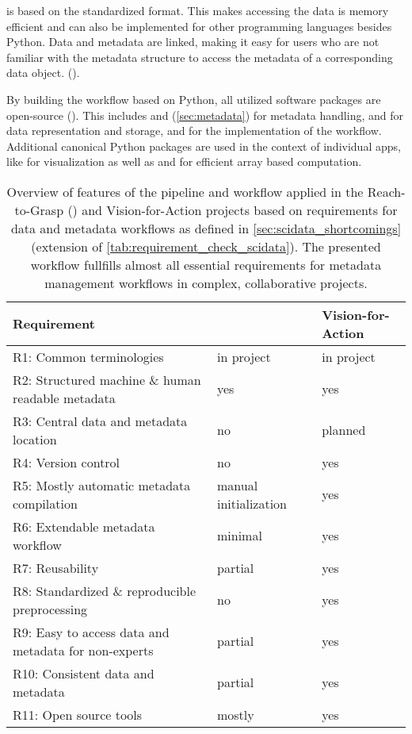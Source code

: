  is based on the standardized  format. This makes accessing the data is memory efficient and can also be implemented for other programming languages besides Python. Data and metadata are linked, making it easy for users who are not familiar with the metadata structure to access the metadata of a corresponding data object. ().

By building the workflow based on Python, all utilized software packages are open-source (). This includes  and  (\cref{sec:metadata}) for metadata handling,  and  for data representation and storage, and  for the implementation of the workflow. Additional  canonical Python packages are used in the context of individual apps, like  for visualization as well as  and  for efficient array based computation.

\begin{table}[]
\footnotesize
\begin{tabular}{|l|l|l|}
\hline
Requirement                                          &  \cite{Brochier_2018} & Vision-for-Action \\  \hline
R1: Common terminologies                             &  in project & in project \\ \hline
R2: Structured machine \& human readable metadata    &  yes & yes \\ \hline
R3: Central data and metadata location               &  no & planned \\ \hline
R4: Version control                                  &  no & yes \\ \hline
R5: Mostly automatic metadata compilation            &  manual initialization & yes \\ \hline
R6: Extendable metadata workflow                     &  minimal & yes \\ \hline
R7: Reusability                                      &  partial & yes \\ \hline
R8: Standardized \& reproducible preprocessing       &  no & yes \\ \hline
R9: Easy to access data and metadata for non-experts &  partial & yes \\ \hline
R10: Consistent data and metadata                    &  partial & yes \\ \hline
R11: Open source tools                               &  mostly & yes \\ \hline
\end{tabular}
\caption[Overview of workflow features for Vision-for-Action project]{Overview of features of the pipeline and workflow applied in the Reach-to-Grasp (\cite{Brochier_2018}) and Vision-for-Action projects based on requirements for data and metadata workflows as defined in \cref{sec:scidata_shortcomings} (extension of \cref{tab:requirement_check_scidata}). The presented workflow fullfills almost all essential requirements for metadata management workflows in complex, collaborative projects.}
\label{tab:requirement_check_v4a}
\end{table}


